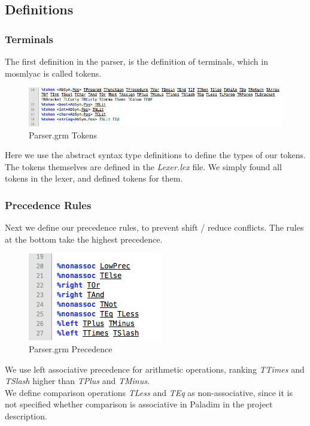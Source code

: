 \documentclass[12pt,a4paper,english]{article}
\begin{document}
\subsection{Definitions}
\subsubsection{Terminals}
The first definition in the parser, is the definition of terminals, which in mosmlyac is called tokens.

\begin{figure}[h]\includegraphics[width=15cm]{Token.jpg}\caption{Parser.grm Tokens}\end{figure}
Here we use the abstract syntax type definitions to define the types of our tokens. The tokens themselves are defined in the \textit{Lexer.lex} file. We simply found all tokens in the lexer, and defined tokens for them.

\subsubsection{Precedence Rules}

Next we define our precedence rules, to prevent shift / reduce conflicts. The rules at the bottom take the highest precedence.

\begin{figure}[h]\includegraphics[]{Prec.jpg}\caption{Parser.grm Precedence}\end{figure}
We use left associative precedence for arithmetic operations, ranking \textit{TTimes} and \textit{TSlash} higher than \textit{TPlus} and \textit{TMinus}. \\

We define comparison operations \textit{TLess} and \textit{TEq} as non-associative, since it is not specified whether comparison is associative in Paladim in the project description. \\
\end{document}
